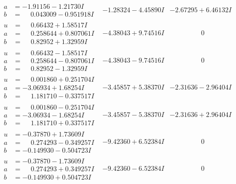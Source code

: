 \documentclass[1p]{elsarticle_modified}
\theoremstyle{definition}
\begin{document}
$$\begin{array}{c|c|c}
\begin{aligned}
a &= -1.91156 - 1.21730 I \\
b &= \phantom{-}0.043009 - 0.951918 I\end{aligned}
 & -1.28324 - 4.45890 I & -2.67295 + 6.46132 I \\ \hline\begin{aligned}
u &= \phantom{-}0.66432 + 1.58517 I \\
a &= \phantom{-}0.258644 + 0.807061 I \\
b &= \phantom{-}0.82952 + 1.32959 I\end{aligned}
 & -4.38043 + 9.74516 I & \phantom{-0.000000 } 0 \\ \hline\begin{aligned}
u &= \phantom{-}0.66432 - 1.58517 I \\
a &= \phantom{-}0.258644 - 0.807061 I \\
b &= \phantom{-}0.82952 - 1.32959 I\end{aligned}
 & -4.38043 - 9.74516 I & \phantom{-0.000000 } 0 \\ \hline\begin{aligned}
u &= \phantom{-}0.001860 + 0.251704 I \\
a &= -3.06934 + 1.68254 I \\
b &= \phantom{-}1.181710 - 0.337517 I\end{aligned}
 & -3.45857 + 5.38370 I & -2.31636 - 2.96404 I \\ \hline\begin{aligned}
u &= \phantom{-}0.001860 - 0.251704 I \\
a &= -3.06934 - 1.68254 I \\
b &= \phantom{-}1.181710 + 0.337517 I\end{aligned}
 & -3.45857 - 5.38370 I & -2.31636 + 2.96404 I \\ \hline\begin{aligned}
u &= -0.37870 + 1.73609 I \\
a &= \phantom{-}0.274293 - 0.349257 I \\
b &= -0.149930 - 0.504723 I\end{aligned}
 & -9.42360 + 6.52384 I & \phantom{-0.000000 } 0 \\ \hline\begin{aligned}
u &= -0.37870 - 1.73609 I \\
a &= \phantom{-}0.274293 + 0.349257 I \\
b &= -0.149930 + 0.504723 I\end{aligned}
 & -9.42360 - 6.52384 I & \phantom{-0.000000 } 0 \\ \hline\begin{aligned}

\end{aligned}
\end{array}$$
\end{document}
